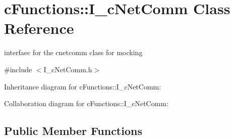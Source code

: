\hypertarget{classcFunctions_1_1I__cNetComm}{}\section{c\+Functions\+::I\+\_\+c\+Net\+Comm Class Reference}
\label{classcFunctions_1_1I__cNetComm}


interfaec for the cnetcomm class for mocking  




{\ttfamily \#include $<$I\+\_\+c\+Net\+Comm.\+h$>$}



Inheritance diagram for c\+Functions\+::I\+\_\+c\+Net\+Comm\+:


Collaboration diagram for c\+Functions\+::I\+\_\+c\+Net\+Comm\+:
\subsection*{Public Member Functions}
